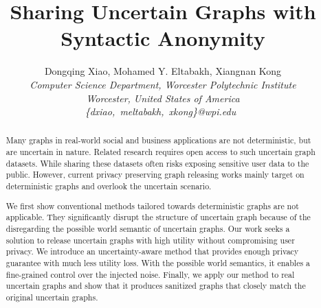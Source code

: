 \documentclass[10pt,conference,letterpaper]{IEEEtran}
\title{Sharing Uncertain Graphs with Syntactic Anonymity}
\author{%
{Dongqing Xiao, Mohamed Y. Eltabakh, Xiangnan Kong}%
\vspace{1.4mm}\\
\fontsize{10}{10}\selectfont\itshape
Computer Science Department, Worcester Polytechnic Institute \\
Worcester, United States of America\\
\fontsize{9}{9}\selectfont\ttfamily\upshape
\{dxiao,~meltabakh,~xkong\}@wpi.edu\
}
\theoremstyle{plain}
\begin{document}
\maketitle


%

\begin{abstract}  
Many graphs in real-world social and business applications are not deterministic, but are uncertain in nature. 
Related research requires open access to such uncertain graph datasets. While sharing these datasets often risks exposing 
sensitive user data to the public. 
However, current privacy preserving graph releasing works mainly target on deterministic graphs and overlook the uncertain scenario. 

We first show conventional methods tailored towards deterministic graphs are not applicable. 
They significantly disrupt the structure of uncertain graph because of the disregarding the possible world semantic of uncertain graphs. 
Our work seeks a solution to release uncertain graphs with high utility without compromising user privacy. We introduce an uncertainty-aware method that provides enough privacy guarantee with much less utility loss. With the possible world semantics, it enables a fine-grained control over the injected noise. Finally, we apply our method to real uncertain graphs and show that it produces sanitized graphs that closely match the original uncertain graphs. 
\end{abstract}




% 

% 
% 

% 

\end{document}
